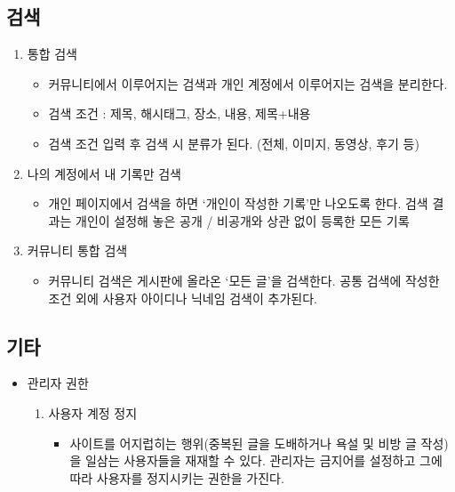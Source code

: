 \subsection{검색}

\begin{enumerate}
    \item 통합 검색
        \begin{itemize}
            \item[] 커뮤니티에서 이루어지는 검색과 개인 계정에서 이루어지는 검색을 분리한다.
            \item[] 검색 조건 : 제목, 해시태그, 장소, 내용, 제목+내용
            \item[] 검색 조건 입력 후 검색 시 분류가 된다. (전체, 이미지, 동영상, 후기 등)
        \end{itemize}
    \item 나의 계정에서 내 기록만 검색
        \begin{itemize}
            \item[] 개인 페이지에서 검색을 하면 ‘개인이 작성한 기록’만 나오도록 한다. 검색 결과는 개인이 설정해 놓은 공개 / 비공개와 상관 없이 등록한 모든 기록
        \end{itemize}
    \item 커뮤니티 통합 검색
        \begin{itemize}
            \item[] 커뮤니티 검색은 게시판에 올라온 ‘모든 글’을 검색한다. 공통 검색에 작성한 조건 외에 사용자 아이디나 닉네임 검색이 추가된다.
        \end{itemize}
\end{enumerate}


\subsection{기타}

\begin{itemize}
    \item 관리자 권한
        \begin{enumerate}
            \item 사용자 계정 정지
                \begin{itemize}
                    \item[] 사이트를 어지럽히는 행위(중복된 글을 도배하거나 욕설 및 비방 글 작성)을 일삼는 사용자들을 재재할 수 있다. 관리자는 금지어를 설정하고 그에 따라 사용자를 정지시키는 권한을 가진다.
                \end{itemize}
        \end{enumerate}
\end{itemize}
\par\
\newpage


